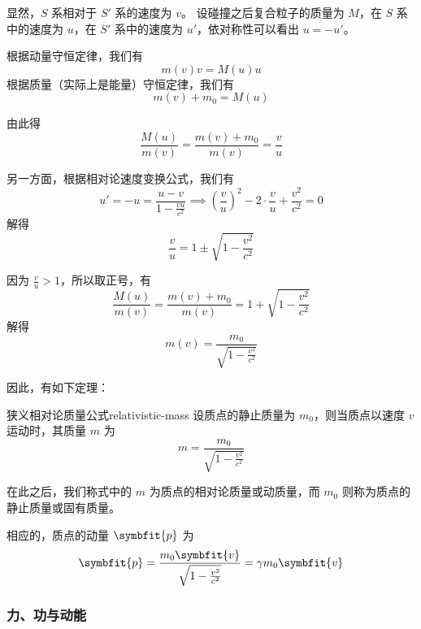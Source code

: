 显然，$S$ 系相对于 $S'$ 系的速度为 $v$。
设碰撞之后复合粒子的质量为 $M$，在 $S$ 系中的速度为 $u$，在 $S'$ 系中的速度为 $u'$，依对称性可以看出 $u = -u'$。

根据动量守恒定律，我们有
\begin{equation}
    m(v) v = M(u) u
\end{equation}
根据质量（实际上是能量）守恒定律，我们有
\begin{equation}
    m(v) + m_0 = M(u)
\end{equation}

由此得
\begin{equation}
    \frac{M(u)}{m(v)} = \frac{m(v) + m_0}{m(v)} = \frac{v}{u}
\end{equation}

另一方面，根据相对论速度变换公式，我们有
\begin{equation}
    u' = -u = \frac{u - v}{1 - \frac{v u}{c^2}} \implies \left(\frac{v}{u}\right)^2 - 2 \cdot \frac{v}{u} + \frac{v^2}{c^2} = 0
\end{equation}
解得
\begin{equation}
    \frac{v}{u} = 1 \pm \sqrt{1 - \frac{v^2}{c^2}}
\end{equation}

因为 $\frac{v}{u} > 1$，所以取正号，有
\begin{equation}
    \frac{M(u)}{m(v)} = \frac{m(v) + m_0}{m(v)} = 1 + \sqrt{1 - \frac{v^2}{c^2}}
\end{equation}
解得
\begin{equation}
    m(v) = \frac{m_0}{\sqrt{1 - \frac{v^2}{c^2}}}
\end{equation}

因此，有如下定理：
\begin{theorem}{狭义相对论质量公式}{relativistic-mass}
    设质点的静止质量为 $m_0$，则当质点以速度 $v$ 运动时，其质量 $m$ 为
    \begin{equation}
        m = \frac{m_0}{\sqrt{1 - \frac{v^2}{c^2}}}
    \end{equation}
\end{theorem}
在此之后，我们称式中的 $m$ 为质点的相对论质量或动质量，而 $m_0$ 则称为质点的静止质量或固有质量。

相应的，质点的动量 $\symbfit{p}$ 为
\begin{equation}
    \symbfit{p} = \frac{m_0 \symbfit{v}}{\sqrt{1 - \frac{v^2}{c^2}}} = \gamma m_0 \symbfit{v}
\end{equation}

\subsubsection{力、功与动能}

